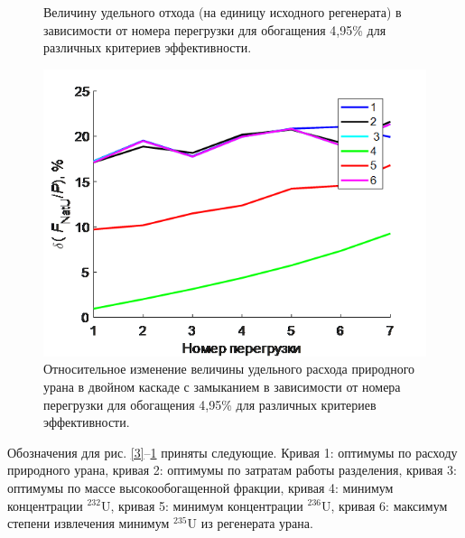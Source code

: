 \begin{figure}[ht]
\begin{minipage}{.5\textwidth}
      \caption{Величину удельного отхода (на единицу исходного регенерата) в зависимости от номера перегрузки для обогащения 4,95\% для различных критериев эффективности.}
      \label{5}
    \end{minipage}
    \begin{minipage}{.5\textwidth}
      \centering
      \includegraphics[width=.8\linewidth]{images/net/6}  
      \caption{Относительное изменение величины удельного расхода природного урана в двойном каскаде с замыканием в зависимости от номера перегрузки для обогащения 4,95\% для различных критериев эффективности.}
      \label{6}
    \end{minipage}
\end{figure}


Обозначения для рис. \ref{3}–\ref{6} приняты следующие. Кривая 1: оптимумы по расходу природного урана, кривая 2: оптимумы по затратам работы разделения, кривая 3: оптимумы по массе высокообогащенной фракции, кривая 4: минимум концентрации $^{232}$U, кривая 5: минимум концентрации $^{236}$U, кривая 6: максимум степени извлечения минимум $^{235}$U из регенерата урана.

